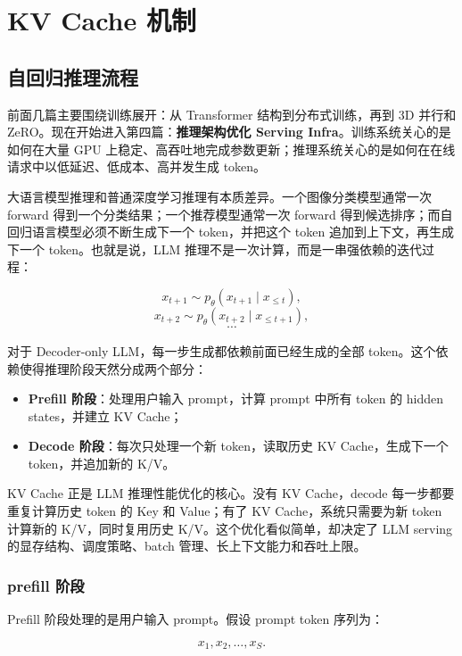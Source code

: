 \chapter{KV Cache 机制}
\label{chap:kv-cache}

\section{自回归推理流程}
\label{sec:autoregressive-inference-flow}

前面几篇主要围绕训练展开：从 Transformer 结构到分布式训练，再到 3D 并行和 ZeRO。现在开始进入第四篇：\textbf{推理架构优化 Serving Infra}。训练系统关心的是如何在大量 GPU 上稳定、高吞吐地完成参数更新；推理系统关心的是如何在在线请求中以低延迟、低成本、高并发生成 token。

大语言模型推理和普通深度学习推理有本质差异。一个图像分类模型通常一次 forward 得到一个分类结果；一个推荐模型通常一次 forward 得到候选排序；而自回归语言模型必须不断生成下一个 token，并把这个 token 追加到上下文，再生成下一个 token。也就是说，LLM 推理不是一次计算，而是一串强依赖的迭代过程：

\[
x_{t+1}\sim p_{\theta}(x_{t+1}\mid x_{\le t}),
\]
\[
x_{t+2}\sim p_{\theta}(x_{t+2}\mid x_{\le t+1}),
\]
\[
\cdots
\]

对于 Decoder-only LLM，每一步生成都依赖前面已经生成的全部 token。这个依赖使得推理阶段天然分成两个部分：

\begin{itemize}
\item \textbf{Prefill 阶段}：处理用户输入 prompt，计算 prompt 中所有 token 的 hidden states，并建立 KV Cache；
\item \textbf{Decode 阶段}：每次只处理一个新 token，读取历史 KV Cache，生成下一个 token，并追加新的 K/V。
\end{itemize}

KV Cache 正是 LLM 推理性能优化的核心。没有 KV Cache，decode 每一步都要重复计算历史 token 的 Key 和 Value；有了 KV Cache，系统只需要为新 token 计算新的 K/V，同时复用历史 K/V。这个优化看似简单，却决定了 LLM serving 的显存结构、调度策略、batch 管理、长上下文能力和吞吐上限。

\subsection{prefill 阶段}
\label{subsec:prefill-stage}

Prefill 阶段处理的是用户输入 prompt。假设 prompt token 序列为：

\[
x_1,x_2,\ldots,x_S.
\]

